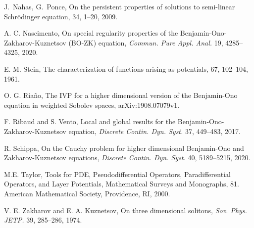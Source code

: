 \documentclass[reqno]{amsart}
\numberwithin{equation}{section}
\begin{document}
\begin{thebibliography}{99}
J.~Nahas, G.~Ponce,
\newblock On the persistent properties of solutions to semi-linear {S}chr\"odinger equation,
 34, 1--20, 2009.

 A. C. Nascimento, On special regularity properties of the Benjamin-Ono-Zakharov-Kuznetsov (BO-ZK) equation,
{\em Commun. Pure Appl. Anal.}  19, 4285--4325, 2020.

E. M. Stein,
\newblock The characterization of functions arising as potentials,
 67, 102--104, 1961.





 O. G. Ria\~no, The IVP for a higher dimensional version of the
Benjamin-Ono equation in weighted Sobolev spaces, arXiv:1908.07079v1.

 F. Ribaud and S. Vento, Local and global results for the Benjamin-Ono-Zakharov-Kuznetsov
equation,  {\em Discrete Contin. Dyn. Syst.}  37, 449--483, 2017.

 R. Schippa, On the Cauchy problem for higher dimensional Benjamin-Ono and Zakharov-Kuznetsov equations, {\em Discrete Contin. Dyn. Syst.}  40, 5189--5215, 2020.

 M.E. Taylor, Tools for PDE, Pseudodifferential Operators, Paradifferential Operators, 
and Layer Potentials, Mathematical Surveys and Monographs, 81. American Mathematical Society, Providence, RI, 2000.



   V. E. Zakharov and E. A.   Kuznetsov, On three dimensional solitons, \textit{Sov. Phys. JETP.} 39,  285--286, 1974.

\end{thebibliography}
\end{document}
